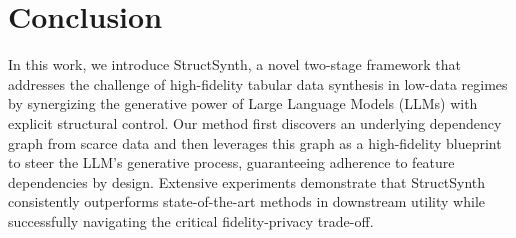 \section{Conclusion}

In this work, we introduce \textsf{StructSynth}, a novel two-stage framework that addresses the challenge of high-fidelity tabular data synthesis in low-data regimes by synergizing the generative power of Large Language Models (LLMs) with explicit structural control. Our method first discovers an underlying dependency graph from scarce data and then leverages this graph as a high-fidelity blueprint to steer the LLM's generative process, guaranteeing adherence to feature dependencies by design. Extensive experiments demonstrate that StructSynth consistently outperforms state-of-the-art methods in downstream utility while successfully navigating the critical fidelity-privacy trade-off.


